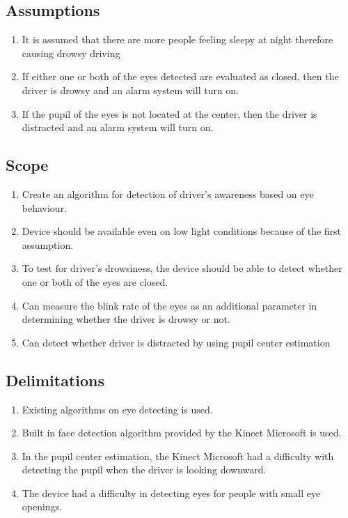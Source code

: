 \subsection{Assumptions}
\begin{enumerate}
	
	\item It is assumed that there are more people feeling sleepy at night therefore causing drowsy driving
	
	\item If either one or both of the eyes detected are evaluated as closed, then the driver is drowsy and an alarm system will turn on.
	
	\item If the pupil of the eyes is not located at the center, then the driver is distracted and an alarm system will turn on.
		
\end{enumerate}

\subsection{Scope}
\begin{enumerate}
	
	\item Create an algorithm for detection of driver’s awareness based on eye behaviour.
	
	\item Device should be available even on low light conditions because of the first assumption.
	
	\item To test for driver’s drowsiness, the device should be able to detect whether one or both of the eyes are closed.
	
	\item Can measure the blink rate of the eyes as an additional parameter in determining whether the driver is drowsy or not.
	
	\item Can detect whether driver is distracted by using pupil center estimation
		
\end{enumerate}

\subsection{Delimitations}
\begin{enumerate}
	
	\item Existing algorithms on eye detecting is used.
	
	\item Built in face detection algorithm provided by the Kinect Microsoft is used.
	
	\item In the pupil center estimation, the Kinect Microsoft had a difficulty with detecting the pupil when the driver is looking downward.
	
	\item The device had a difficulty in detecting eyes for people with small eye openings.
		
\end{enumerate}

